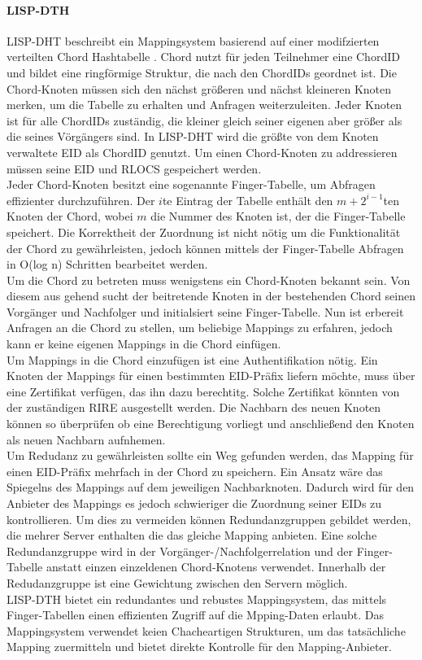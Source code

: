 \paragraph{LISP-DTH} 
LISP-DHT beschreibt ein Mappingsystem basierend auf einer modifzierten verteilten Chord Hashtabelle \cite{mathy:2008:dht}. Chord nutzt für jeden Teilnehmer eine ChordID und bildet eine ringförmige Struktur, die nach den ChordIDs geordnet ist. Die Chord-Knoten müssen sich den nächst größeren und nächst kleineren Knoten merken, um die Tabelle zu erhalten und Anfragen weiterzuleiten. Jeder Knoten ist für alle ChordIDs zuständig, die kleiner gleich seiner eigenen aber größer als die seines Vörgängers sind. In LISP-DHT wird die größte von dem Knoten verwaltete EID als ChordID genutzt. Um einen Chord-Knoten zu addressieren müssen seine EID und RLOCS gespeichert werden. \\
Jeder Chord-Knoten besitzt eine sogenannte Finger-Tabelle, um Abfragen effizienter durchzuführen. Der $i$te Eintrag der Tabelle enthält den $m+2^{i-1}$ten Knoten der Chord, wobei $m$ die Nummer des Knoten ist, der die Finger-Tabelle speichert. Die Korrektheit der Zuordnung ist nicht nötig um die Funktionalität der Chord zu gewährleisten, jedoch können mittels der Finger-Tabelle Abfragen in O(log n) Schritten bearbeitet werden. \\
Um  die Chord zu betreten muss wenigstens ein Chord-Knoten bekannt sein. Von diesem aus gehend sucht der beitretende Knoten in der bestehenden Chord seinen Vorgänger und  Nachfolger und initialsiert seine Finger-Tabelle. Nun ist erbereit Anfragen an die Chord zu stellen, um beliebige Mappings zu erfahren, jedoch kann er keine eigenen Mappings in die Chord einfügen. \\
Um Mappings in die Chord einzufügen ist eine Authentifikation nötig. Ein Knoten der Mappings für einen bestimmten EID-Präfix liefern möchte, muss über eine Zertifikat verfügen, das ihn dazu berechtitg. Solche Zertifikat könnten von der zuständigen RIRE ausgestellt werden. Die Nachbarn des neuen Knoten können so überprüfen ob eine Berechtigung vorliegt und anschließend den Knoten als neuen Nachbarn aufnhemen. \\
Um Redudanz zu gewährleisten sollte ein Weg gefunden werden, das Mapping für einen EID-Präfix mehrfach in der Chord zu speichern. Ein Ansatz wäre das Spiegelns des Mappings auf dem jeweiligen Nachbarknoten. Dadurch wird für den Anbieter des Mappings es jedoch schwieriger die Zuordnung seiner EIDs zu kontrollieren. Um dies zu vermeiden können Redundanzgruppen gebildet werden, die mehrer Server enthalten die das gleiche Mapping anbieten. Eine solche Redundanzgruppe wird in der Vorgänger-/Nachfolgerrelation und der Finger-Tabelle anstatt einzen einzeldenen Chord-Knotens verwendet. Innerhalb der Redudanzgruppe ist eine Gewichtung zwischen den Servern möglich. \\
LISP-DTH bietet ein redundantes und rebustes Mappingsystem, das mittels Finger-Tabellen einen effizienten Zugriff auf die Mpping-Daten erlaubt. Das Mappingsystem verwendet keien Chacheartigen Strukturen, um das tatsächliche Mapping zuermitteln und bietet direkte Kontrolle für den Mapping-Anbieter. 



